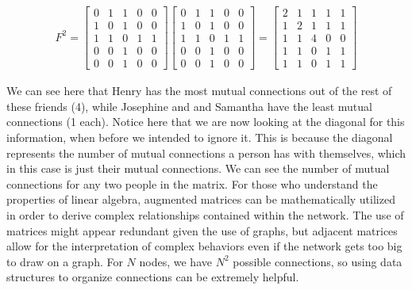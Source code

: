 \documentclass{article}
\begin{document}
    \begin{align*} 
    F^2=
        \begin{bmatrix}
            0 & 1 & 1 & 0 & 0\\[-13pt]
            1 & 0 & 1 & 0 & 0\\[-13pt]
            1 & 1 & 0 & 1 & 1\\[-13pt]
            0 & 0 & 1 & 0 & 0\\[-13pt]
            0 & 0 & 1 & 0 & 0
        \end{bmatrix}
        \begin{bmatrix}
            0 & 1 & 1 & 0 & 0\\[-13pt]
            1 & 0 & 1 & 0 & 0\\[-13pt]
            1 & 1 & 0 & 1 & 1\\[-13pt]
            0 & 0 & 1 & 0 & 0\\[-13pt]
            0 & 0 & 1 & 0 & 0
        \end{bmatrix}
        =
        \begin{bmatrix}
            2 & 1 & 1 & 1 & 1\\[-13pt]
            1 & 2 & 1 & 1 & 1\\[-13pt]
            1 & 1 & 4 & 0 & 0\\[-13pt]
            1 & 1 & 0 & 1 & 1\\[-13pt]
            1 & 1 & 0 & 1 & 1
        \end{bmatrix}
    \end{align*}

    We can see here that Henry has the most mutual connections out of the rest of these friends (4), while Josephine and and Samantha have the least mutual connections (1 each). Notice here that we are now looking at the diagonal for this information, when before we intended to ignore it. This is because the diagonal represents the number of mutual connections a person has with themselves, which in this case is just their mutual connections. We can see the number of mutual connections for any two people in the matrix. For those who understand the properties of linear algebra, augmented matrices can be mathematically utilized in order to derive complex relationships contained within the network. The use of matrices might appear redundant given the use of graphs, but adjacent matrices allow for the interpretation of complex behaviors even if the network gets too big to draw on a graph. For {\large $N$} nodes, we have {\large $N^2$} possible connections, so using data structures to organize connections can be extremely helpful. 
    
\end{document}
